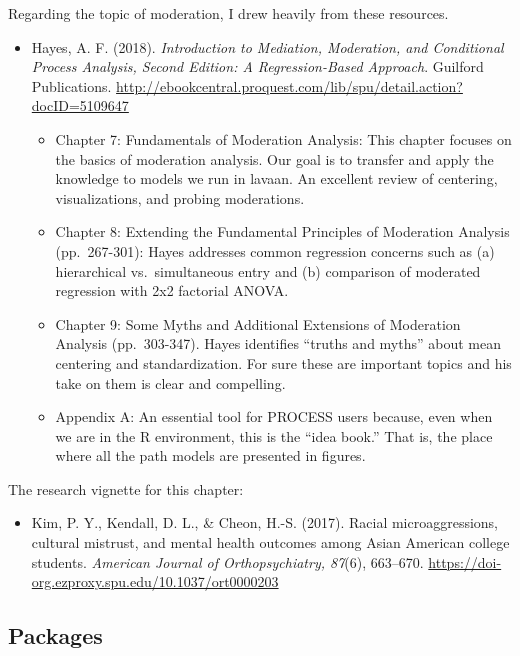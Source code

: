 \documentclass[
  11pt,
]{book}
\providecommand{\tightlist}{%
  \setlength{\itemsep}{0pt}\setlength{\parskip}{0pt}}
\begin{document}
Regarding the topic of moderation, I drew heavily from these resources.

\begin{itemize}
\tightlist
\item
  Hayes, A. F. (2018). \emph{Introduction to Mediation, Moderation, and Conditional Process Analysis, Second Edition: A Regression-Based Approach}. Guilford Publications. \url{http://ebookcentral.proquest.com/lib/spu/detail.action?docID=5109647}

  \begin{itemize}
  \tightlist
  \item
    Chapter 7: Fundamentals of Moderation Analysis: This chapter focuses on the basics of moderation analysis. Our goal is to transfer and apply the knowledge to models we run in lavaan. An excellent review of centering, visualizations, and probing moderations.
  \item
    Chapter 8: Extending the Fundamental Principles of Moderation Analysis (pp.~267-301): Hayes addresses common regression concerns such as (a) hierarchical vs.~simultaneous entry and (b) comparison of moderated regression with 2x2 factorial ANOVA.
  \item
    Chapter 9: Some Myths and Additional Extensions of Moderation Analysis (pp.~303-347). Hayes identifies ``truths and myths'' about mean centering and standardization. For sure these are important topics and his take on them is clear and compelling.
  \item
    Appendix A: An essential tool for PROCESS users because, even when we are in the R environment, this is the ``idea book.'' That is, the place where all the path models are presented in figures.
  \end{itemize}
\end{itemize}

The research vignette for this chapter:

\begin{itemize}
\tightlist
\item
  Kim, P. Y., Kendall, D. L., \& Cheon, H.-S. (2017). Racial microaggressions, cultural mistrust, and mental health outcomes among Asian American college students. \emph{American Journal of Orthopsychiatry, 87}(6), 663--670. \url{https://doi-org.ezproxy.spu.edu/10.1037/ort0000203}
\end{itemize}

\hypertarget{packages-6}{%
\subsection{Packages}\label{packages-6}}
\end{document}
